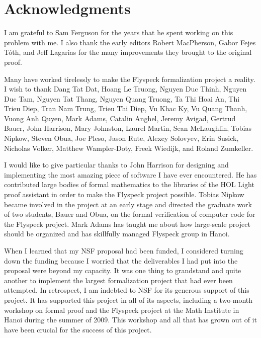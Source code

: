

\section*{Acknowledgments}


I am grateful to Sam Ferguson for the years that he spent working on
this problem with me.  I also thank the early editors Robert
MacPherson, Gabor Fejes T\'oth, and Jeff Lagarias for the many
improvements they brought to the original proof.

Many have worked tirelessly to make the Flyspeck formalization project
a reality.  I wish to thank 
Dang Tat Dat, 
Hoang Le Truong,
Nguyen Duc Thinh,  
Nguyen Duc Tam, 
Nguyen Tat Thang,
Nguyen Quang Truong, 
Ta Thi Hoai An, 
Thi Trieu Diep,
Tran Nam Trung, 
Trieu Thi Diep, 
Vu Khac Ky, 
Vu Quang Thanh,
Vuong Anh Quyen,
% 
Mark Adams,
Catalin Anghel, 
Jeremy Avigad, 
Gertrud Bauer, 
%
John Harrison, 
Mary Johnston, 
Laurel %
Martin, 
Sean McLaughlin, 
Tobias Nipkow, 
Steven Obua, 
Joe Pleso, 
%
Jason Rute,
Alexey Solovyev,
Erin Susick,
Nicholas Volker, 
Matthew Wampler-Doty, 
 Freek Wiedijk, 
and Roland Zumkeller.

I would like to give particular thanks 
to John Harrison for designing and implementing the
most amazing piece of software I have ever encountered.  He has
contributed large bodies of formal mathematics to the libraries of the
HOL Light proof assistant in order to make the Flyspeck project
possible.  Tobias Nipkow became involved in the project at an early
stage and directed the graduate work of two students, Bauer and Obua,
on the formal verification of computer code for the Flyspeck
project. Mark Adams has taught me about how large-scale project should
be organized and has skillfully managed Flyspeck group in Hanoi.

When I learned that my NSF proposal had been funded, I considered
turning down the funding because I worried that the deliverables I had
put into the proposal were beyond my capacity.  It was one thing to
grandstand and quite another to implement the largest formalization
project that had ever been attempted.  In retrospect, I am indebted to
NSF for its generous support of this project.  It has supported this
project in all of its aspects, including a two-month workshop on
formal proof and the Flyspeck project at the Math Institute in Hanoi
during the summer of 2009.  This workshop and all that has grown out
of it have been crucial for the success of this project.

